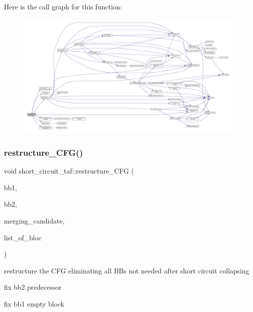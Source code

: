 Here is the call graph for this function\+:
\nopagebreak
\begin{figure}[H]
\begin{center}
\leavevmode
\includegraphics[width=350pt]{dd/d1c/classshort__circuit__taf_a859bc9ef4199b52ef26a8bd39fcb699b_cgraph}
\end{center}
\end{figure}
\mbox{\label{classshort__circuit__taf_a9f88813508d66f82309a90b24788f3f1}} 
\subsubsection{\texorpdfstring{restructure\+\_\+\+C\+F\+G()}{restructure\_CFG()}}
{\footnotesize\ttfamily void short\+\_\+circuit\+\_\+taf\+::restructure\+\_\+\+C\+FG (\begin{DoxyParamCaption}\item[{unsigned int}]{bb1,  }\item[{unsigned int}]{bb2,  }\item[{unsigned int}]{merging\+\_\+candidate,  }\item[{std\+::map$<$ unsigned int, bloc\+Ref $>$ \&}]{list\+\_\+of\+\_\+bloc }\end{DoxyParamCaption})\hspace{0.3cm}{\ttfamily [private]}}



restructure the C\+FG eliminating all B\+Bs not needed after short circuit collapsing 

fix bb2 predecessor

fix bb1 empty block

